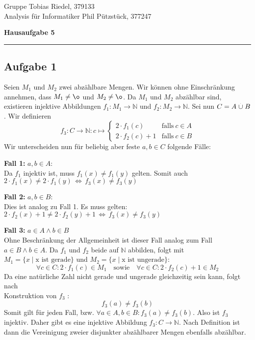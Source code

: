 \documentclass[a4paper,graphics,11pt]{article}
\newcommand{\aufgabe}[1]{\subsection*{Aufgabe #1}}
\newcommand{\up}[2]{\mathrel{\overset{\makebox[0pt]{\mbox{\normalfont\tiny #2}}}{#1}}}
\begin{document}
\noindent Gruppe              \hfill Tobias Riedel, 379133 \\
\noindent Analysis für Informatiker             \hfill Phil Pützstück, 377247 \\

\begin{center}
     \LARGE{\textbf{Hausaufgabe 5}}
\end{center}
\begin{center}
\rule[0.1ex]{\textwidth}{1pt}
\end{center}



\aufgabe{1}
Seien $M_1$ und $M_2$ zwei abzählbare Mengen. Wir können ohne Einschränkung annehmen,
dass $M_1 \neq \o$ und $M_2 \neq \o$. Da $M_1$ und $M_2$ abzählbar sind, existieren
injektive Abbildungen $f_1\colon M_1 \rightarrow \mathbb{N}$ und $f_2 \colon M_2 \rightarrow \mathbb{N}$. Sei nun $C = A \up{\cup}{.}B$. Wir definieren
$$
    f_3\colon C \rightarrow \mathbb{N} \colon c\mapsto \begin{cases}
        2\cdot f_1(c) & \text{falls}\ c \in A\\
        2\cdot f_2(c)+1 & \text{falls}\ c \in B
    \end{cases}
$$
Wir unterscheiden nun für beliebig aber feste $a,b \in C$ folgende Fälle:

\textbf{Fall 1:} $a,b \in A$:\\
Da $f_1$ injektiv ist, muss $f_1(x)\neq f_1(y)$ gelten. Somit auch $2\cdot f_1(x) \neq 2\cdot f_1(y) \,\Leftrightarrow\, f_3(x)\neq f_3(y)$

\textbf{Fall 2:} $a,b \in B$:\\
Dies ist analog zu Fall 1. Es muss gelten: $2\cdot f_2(x)+1 \neq 2\cdot f_2(y)+1
\,\Leftrightarrow\, f_3(x)\neq f_3(y)$

\textbf{Fall 3:} $a \in A \land b \in B$\\
Ohne Beschränkung der Allgemeinheit ist dieser Fall analog zum Fall $a \in B \land b \in A$.
Da $f_1$ und $f_2$ beide auf $\mathbb{N}$ abbilden, folgt mit $M_1=\{x\mid\text{x ist gerade}\}$ und $M_2=\{x\mid\text{x ist ungerade}\}$:
$$
    \forall c \in C \colon 2\cdot f_1(c) \in M_1
    \quad\text{sowie}\quad
    \forall c \in C \colon 2\cdot f_2(c)+1 \in M_2
$$
Da eine natürliche Zahl nicht gerade und ungerade gleichzeitig sein kann, folgt nach\\
Konstruktion von $f_3$ :
$$
    f_3(a) \neq f_3(b)
$$
Somit gilt für jeden Fall, bzw. $\forall a\in A, b\in B\colon f_3(a) \neq f_3(b)$. Also ist $f_3$ injektiv.
Daher gibt es eine injektive Abbildung $f_3 \colon C\rightarrow \mathbb{N}$.
Nach Definition ist dann die Vereinigung zweier disjunkter abzählbarer Mengen ebenfalls abzählbar.
\end{document}
